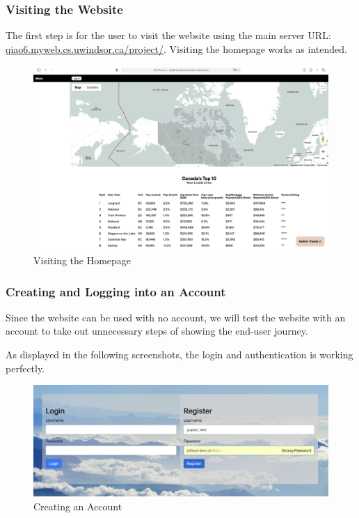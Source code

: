 \documentclass[12pt, letterpaper]{article}
\begin{document}
\subsubsection*{Visiting the Website}
The first step is for the user to visit the website using the main server URL: \url{qiao6.myweb.cs.uwindsor.ca/project/}. Visiting the homepage works as intended.
\begin{figure}[htbp]
	\centering
	\includegraphics[width=\textwidth]{images/30-journey-e01.png}
	\caption{Visiting the Homepage}
 \end{figure}

\newpage
\subsubsection*{Creating and Logging into an Account}
Since the website can be used with no account, we will test the website with an account to take out unnecessary steps of showing the end-user journey.

As displayed in the following screenshots, the login and authentication is working perfectly.

\begin{figure}[htbp]
	\centering
	\includegraphics[width=\textwidth]{images/30-journey-e02a.png}
	\caption{Creating an Account}
 \end{figure}
\end{document}
